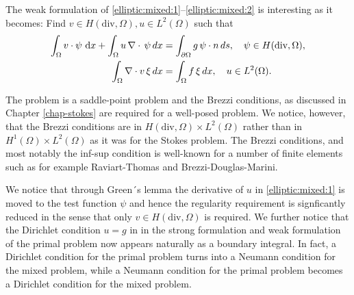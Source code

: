 The weak formulation of \eqref{elliptic:mixed:1}--\eqref{elliptic:mixed:2} is interesting as
it becomes: 
Find $v \in H(\mbox{div}, \Omega), u \in L^2(\Omega)$ such that  
\begin{align}
\label{mixed:darcy:1}
\int_\Omega v \cdot \psi \, \, \mathrm{d}x + \int_\Omega u \, \nabla \cdot \, \psi \, dx &= \int_{\partial \Omega} g \, \psi \cdot n \, ds, \quad \psi \in H(\mbox{div}, \Omega), \\  
\label{mixed:darcy:2}
\int_\Omega \nabla \cdot v \, \xi \, dx &= \int_{\Omega} f \, \xi \, dx, \quad  u \in L^2(\Omega) .  
\end{align}

The problem is a saddle-point problem and the Brezzi conditions, as discussed in Chapter \ref{chap-stokes} are
required for a well-posed problem. We notice, however, that the Brezzi conditions are   
in $H(\mbox{div}, \Omega) \times L^2(\Omega)$ rather than in $H^1(\Omega) \times L^2(\Omega)$ as it
was for the Stokes problem.  The Brezzi conditions, and most notably the inf-sup condition 
is well-known for a number of finite elements such as for example Raviart-Thomas and Brezzi-Douglas-Marini.   

We notice that through Green´s lemma the derivative of $u$ in \eqref{elliptic:mixed:1} is
moved to the test function $\psi$ and hence the regularity requirement is signficantly reduced in the sense
that only $v \in H(\mbox{div}, \Omega)$ is required. We further notice that the Dirichlet condition $u = g$ in 
in the strong formulation and weak formulation of the primal problem now appears naturally as a boundary integral.   
In fact, a Dirichlet condition for the primal problem turns into a Neumann condition for the mixed problem, while 
a Neumann condition for the primal problem becomes a Dirichlet condition for the mixed problem. 

